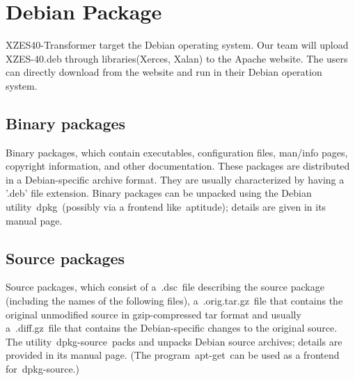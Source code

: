 \section{Debian Package}
XZES40-Transformer target the Debian operating system. Our team will upload XZES-40.deb through libraries(Xerces, Xalan) to the Apache website. The users can directly download from the website and run in their Debian operation system. 
\subsection{Binary packages}
Binary packages, which contain executables, configuration files, man/info pages, copyright information, and other documentation. These packages are distributed in a Debian-specific archive format. They are usually characterized by having a '.deb' file extension. Binary packages can be unpacked using the Debian utility dpkg (possibly via a frontend like aptitude); details are given in its manual page.
\subsection{Source packages}
Source packages, which consist of a .dsc file describing the source package (including the names of the following files), a .orig.tar.gz file that contains the original unmodified source in gzip-compressed tar format and usually a .diff.gz file that contains the Debian-specific changes to the original source. The utility dpkg-source packs and unpacks Debian source archives; details are provided in its manual page. (The program apt-get can be used as a frontend for dpkg-source.)
\subsection{}
